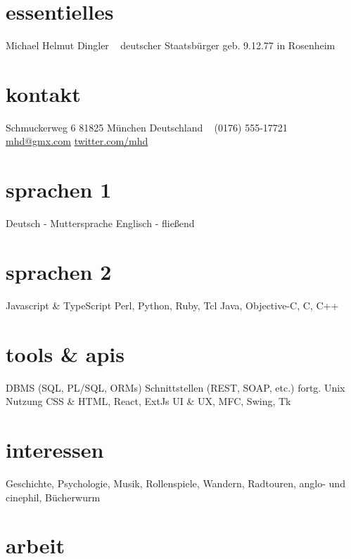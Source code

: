 \documentclass[]{friggeri-cv-a4}
\begin{document}


\begin{aside} %
\section{essentielles}
Michael Helmut Dingler
~
deutscher Staatsbürger
geb. 9.12.77 in Rosenheim
\section{kontakt}
Schmuckerweg 6
81825 München
Deutschland
~
(0176) 555-17721
~
\href{mailto:mhd@gmx.com}{mhd@gmx.com}
\href{http://twitter.com/mhd}{twitter.com/mhd}
\section{sprachen 1}
Deutsch - Muttersprache
Englisch - fließend
\section{sprachen 2}
Javascript \& TypeScript
Perl, Python, Ruby, Tcl
Java, Objective-C, C, C++
\section{tools \& apis}
DBMS (SQL, PL/SQL, ORMs)
Schnittstellen (REST, SOAP, etc.)
fortg. Unix Nutzung
CSS \& HTML, React, ExtJs
UI \& UX, MFC, Swing, Tk
\section{interessen}
Geschichte, Psychologie,
Musik, Rollenspiele,
Wandern, Radtouren,
anglo- und cinephil,
Bücherwurm
\end{aside}


\section{arbeit}

\end{document}
